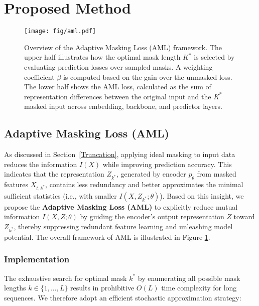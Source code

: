 \documentclass{article}
\begin{document}
\section{Proposed Method}
\label{headings}
\begin{figure}
    \centering
    \texttt{[image: fig/aml.pdf]}
    \caption{Overview of the Adaptive Masking Loss (AML) framework. The upper half illustrates how the optimal mask length \( K^* \) is selected by evaluating prediction losses over sampled masks. A weighting coefficient \( \beta \) is computed based on the gain over the unmasked loss. The lower half shows the AML loss, calculated as the sum of representation differences between the original input and the \( K^* \) masked input across embedding, backbone, and predictor layers.}
    \label{fig:aml}
\end{figure}

\subsection{Adaptive Masking Loss (AML)}
\label{sec:aml}
As discussed in Section~\ref{Truncation}, applying ideal masking to input data reduces the information $I(X)$ while improving prediction accuracy. This indicates that the representation $Z_{k^*}$, generated by encoder $p_\theta$ from masked features $X_{t,k^{*}}$, contains less redundancy and better approximates the minimal sufficient statistics (i.e., with smaller $I(X,Z_{k^*};\theta)$). Based on this insight, we propose the \textbf{Adaptive Masking Loss (AML)} to explicitly reduce mutual information $I(X,Z;\theta)$ by guiding the encoder's output representation $Z$ toward $Z_{k^*}$, thereby suppressing redundant feature learning and unleashing model potential. The overall framework of AML is illustrated in Figure \ref{fig:aml}.
\subsubsection{Implementation}

The exhaustive search for optimal mask $k^*$ by enumerating all possible mask lengths $k \in \{1,...,L\}$ results in prohibitive $O(L)$ time complexity for long sequences. We therefore adopt an efficient stochastic approximation strategy:
\end{document}
